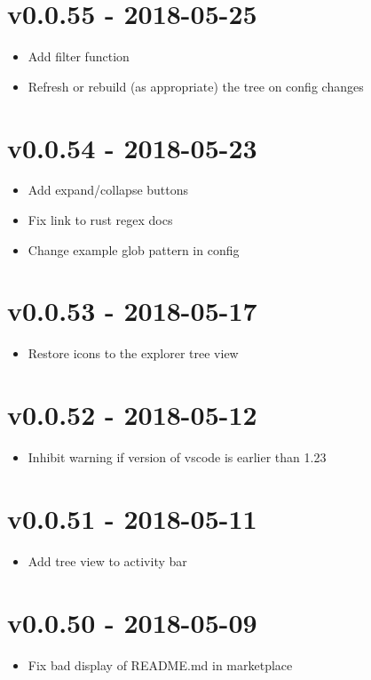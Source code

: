 \chapter{v0.0.55 - 2018-05-25}
\begin{itemize}
\item{Add filter function}
\item{Refresh or rebuild (as appropriate) the tree on config changes}
\end{itemize}

\chapter{v0.0.54 - 2018-05-23}
\begin{itemize}
\item{Add expand/collapse buttons}
\item{Fix link to rust regex docs}
\item{Change example glob pattern in config}
\end{itemize}

\chapter{v0.0.53 - 2018-05-17}
\begin{itemize}
\item{Restore icons to the explorer tree view}
\end{itemize}

\chapter{v0.0.52 - 2018-05-12}
\begin{itemize}
\item{Inhibit warning if version of vscode is earlier than 1.23}
\end{itemize}

\chapter{v0.0.51 - 2018-05-11}
\begin{itemize}
\item{Add tree view to activity bar}
\end{itemize}

\chapter{v0.0.50 - 2018-05-09}
\begin{itemize}
\item{Fix bad display of README.md in marketplace}
\end{itemize}


